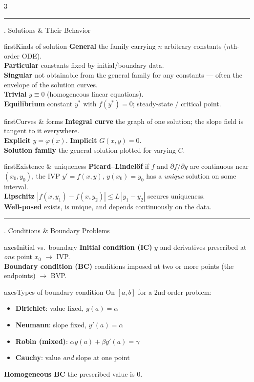 \documentclass[10pt]{article}
\newcommand{\lab}[1]{\textcolor{ink}{\sffamily\footnotesize\textbf{#1}}\;}
\newcommand{\sect}[2]{%
  \begin{tcolorbox}[blanker, breakable, before skip=2pt, after skip=2pt]
  \begingroup\sffamily\bfseries\normalsize\color{#1}%
  {\color{#1}\rule[-1pt]{3pt}{12pt}}\;#2\endgroup
  \par\vspace{1pt}{\color{#1}\hrule height 1pt}
  \end{tcolorbox}}
\begin{document}
\footnotesize\linespread{0.95}\selectfont
\begin{multicols}{3}

\sect{first}{5.\; Solutions \& Their Behavior}

\begin{card}{first}{Kinds of solution}
\lab{General} the family carrying $n$ arbitrary constants ($n$th-order ODE).\\
\lab{Particular} constants fixed by initial/boundary data.\\
\lab{Singular} not obtainable from the general family for any constants --- often the envelope of the solution curves.\\
\lab{Trivial} $y\equiv 0$ (homogeneous linear equations).\\
\lab{Equilibrium} constant $y^\ast$ with $f(y^\ast)=0$; steady-state / critical point.
\end{card}

\begin{card}{first}{Curves \& forms}
\lab{Integral curve} the graph of one solution; the slope field is tangent to it everywhere.\\
\lab{Explicit} $y=\varphi(x)$. \quad\lab{Implicit} $G(x,y)=0$.\\
\lab{Solution family} the general solution plotted for varying $C$.
\end{card}

\begin{card}{first}{Existence \& uniqueness}
\lab{Picard--Lindel\"of} if $f$ and $\partial f/\partial y$ are continuous near $(x_0,y_0)$, the IVP $y'=f(x,y),\,y(x_0)=y_0$ has a \emph{unique} solution on some interval.\\
\lab{Lipschitz} $|f(x,y_1)-f(x,y_2)|\le L\,|y_1-y_2|$ secures uniqueness.\\
\lab{Well-posed} exists, is unique, and depends continuously on the data.
\end{card}

\sect{axes}{6.\; Conditions \& Boundary Problems}

\begin{card}{axes}{Initial vs.\ boundary}
\lab{Initial condition (IC)} $y$ and derivatives prescribed at \emph{one} point $x_0$ $\to$ IVP.\\
\lab{Boundary condition (BC)} conditions imposed at two or more points (the endpoints) $\to$ BVP.
\end{card}

\begin{card}{axes}{Types of boundary condition}
On $[a,b]$ for a 2nd-order problem:
\begin{itemize}
\item \textbf{Dirichlet}: value fixed, $y(a)=\alpha$
\item \textbf{Neumann}: slope fixed, $y'(a)=\alpha$
\item \textbf{Robin (mixed)}: $\alpha y(a)+\beta y'(a)=\gamma$
\item \textbf{Cauchy}: value \emph{and} slope at one point
\end{itemize}
\lab{Homogeneous BC} the prescribed value is $0$.
\end{card}


\end{multicols}
\end{document}
